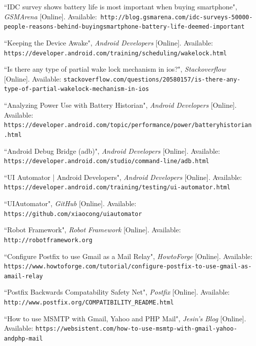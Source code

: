 \documentclass[runningheads,a4paper,12pt]{report}
\begin{document}

\begin{thebibliography}{1}

 ``IDC survey shows battery life is most important when buying smartphone", \textit{GSMArena} [Online]. Available:\texttt{ http://blog.gsmarena.com/idc-surveys-50000-people-reasons-behind-buying\-smartphone-battery-life-deemed-important}
 
``Keeping the Device Awake", \textit{Android Developers} [Online]. Available: \texttt{https://developer.android.com/training/scheduling/wakelock.html} 
 
 ``Is there any type of partial wake lock mechanism in ios?", \textit{Stackoverflow} [Online]. Available: \texttt{stackoverflow.com/questions/20580157/is-there-any-type-of-partial-wake\-lock-mechanism-in-ios}

``Analyzing Power Use with Battery Historian", \textit{Android Developers} [Online]. Available: \texttt{https://developer.android.com/topic/performance/power/battery\-historian.html}

``Android Debug Bridge (adb)", \textit{Android Developers} [Online]. Available: \texttt{https://developer.android.com/studio/command-line/adb.html}

``UI Automator | Android Developers", \textit{Android Developers} [Online]. Available: \texttt{https://developer.android.com/training/testing/ui-automator.html}

``UIAutomator", \textit{GitHub} [Online]. Available: \texttt{https://github.com/xiaocong/uiautomator}

``Robot Framework", \textit{Robot Framework} [Online]. Available: \texttt{http://robotframework.org}

``Configure Postfix to use Gmail as a Mail Relay", \textit{HowtoForge} [Online]. Available: \texttt{https://www.howtoforge.com/tutorial/configure-postfix-to-use-gmail-as-a\-mail-relay}

``Postfix Backwards Compatability Safety Net", \textit{Postfix} [Online]. Available: \texttt{http://www.postfix.org/COMPATIBILITY\_README.html}

``How to use MSMTP with Gmail, Yahoo and PHP Mail", \textit{Jesin's Blog} [Online]. Available: \texttt{https://websistent.com/how-to-use-msmtp-with-gmail-yahoo-and\-php-mail}
\end{thebibliography}
\end{document}
